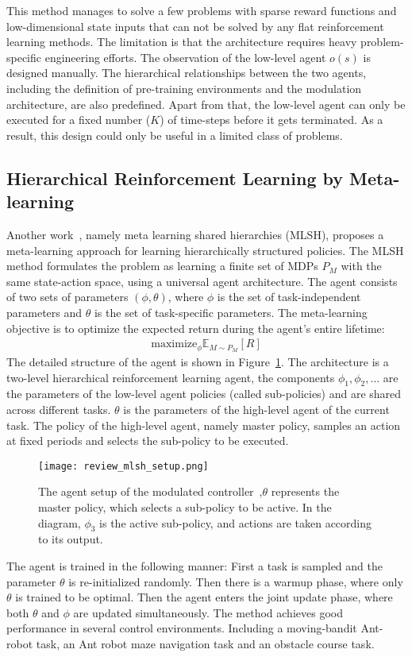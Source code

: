 This method manages to solve a few problems with sparse reward functions and low-dimensional state inputs that can not be solved by any flat reinforcement learning methods. The limitation is that the architecture requires heavy problem-specific engineering efforts. The observation of the low-level agent $o(s)$ is designed manually. The hierarchical relationships between the two agents, including the definition of pre-training environments and the modulation architecture, are also predefined. Apart from that, the low-level agent can only be executed for a fixed number ($K$) of time-steps before it gets terminated. As a result, this design could only be useful in a limited class of problems.

\subsection{Hierarchical Reinforcement Learning by Meta-learning}
Another work~\cite{frans2017meta}, namely meta learning shared hierarchies (MLSH), proposes a meta-learning approach for learning hierarchically structured policies.
The MLSH method formulates the problem as learning a finite set of MDPs $P_M$ with the same state-action space, using a universal agent architecture. The agent consists of two sets of parameters $(\phi,\theta)$, where $\phi$ is the set of task-independent parameters and $\theta$ is the set of task-specific parameters. The meta-learning objective is to optimize the expected return during the agent's entire lifetime:
\begin{align}
\mathrm{maximize}_\phi \mathbb{E}_{M\sim P_M}[R]
\end{align}
The detailed structure of the agent is shown in Figure~\ref{review_mlsh_arch}. The architecture is a two-level hierarchical reinforcement learning agent, the components $\phi_1,\phi_2,\dots$ are the parameters of the low-level agent policies (called sub-policies) and are shared across different tasks. $\theta$ is the parameters of the high-level agent of the current task. The policy of the high-level agent, namely master policy, samples an action at fixed periods and selects the sub-policy to be executed.
\begin{figure}[h]
	\texttt{[image: review\_mlsh\_setup.png]}
	\centering
	\caption{The agent setup of the modulated controller~\cite{frans2017meta},$\theta$ represents the master policy, which selects
		a sub-policy to be active. In the diagram, $\phi_3$ is the active sub-policy, and actions are taken according
		to its output.}\label{review_mlsh_arch}
\end{figure}
The agent is trained in the following manner: First a task is sampled and the parameter $\theta$ is re-initialized randomly. Then there is a warmup phase, where only $\theta$ is trained to be optimal. Then the agent enters the joint update phase, where both $\theta$ and $\phi$ are updated simultaneously.
The method achieves good performance in several control environments. Including a moving-bandit Ant-robot task, an Ant robot maze navigation task and an obstacle course task. 

